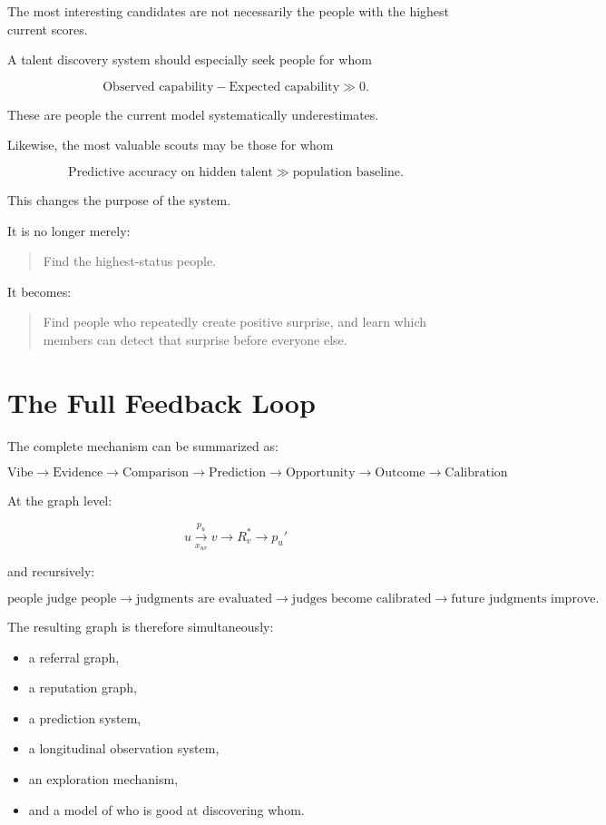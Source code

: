 \documentclass[11pt]{article}
\begin{document}
The most interesting candidates are not necessarily the people with the
highest current scores.

A talent discovery system should especially seek people for whom

\[
\boxed{
\text{Observed capability}
-
\text{Expected capability}
\gg 0.
}
\]

These are people the current model systematically underestimates.

Likewise, the most valuable scouts may be those for whom

\[
\boxed{
\text{Predictive accuracy on hidden talent}
\gg
\text{population baseline}.
}
\]

This changes the purpose of the system.

It is no longer merely:

\begin{quote}
Find the highest-status people.
\end{quote}

It becomes:

\begin{quote}
Find people who repeatedly create positive surprise, and learn which members
can detect that surprise before everyone else.
\end{quote}

\section{The Full Feedback Loop}

The complete mechanism can be summarized as:

\[
\boxed{
\text{Vibe}
\rightarrow
\text{Evidence}
\rightarrow
\text{Comparison}
\rightarrow
\text{Prediction}
\rightarrow
\text{Opportunity}
\rightarrow
\text{Outcome}
\rightarrow
\text{Calibration}
}
\]

At the graph level:

\[
u
\xrightarrow[x_{uv}]{p_u}
v
\rightarrow
R_v^\ast
\rightarrow
p_u'
\]

and recursively:

\[
\text{people judge people}
\rightarrow
\text{judgments are evaluated}
\rightarrow
\text{judges become calibrated}
\rightarrow
\text{future judgments improve}.
\]

The resulting graph is therefore simultaneously:

\begin{itemize}
    \item a referral graph,
    \item a reputation graph,
    \item a prediction system,
    \item a longitudinal observation system,
    \item an exploration mechanism,
    \item and a model of who is good at discovering whom.
\end{itemize}
\end{document}
